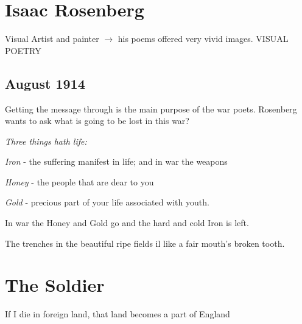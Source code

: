\documentclass{article}
\title{\jobname}
\author{Eugenio Animali}
\begin{document}
\maketitle

\section{Isaac Rosenberg}
Visual Artist and painter $\to$ his poems offered very vivid images. VISUAL POETRY

\subsection{August 1914}
Getting the message through is the main purpose of the war poets. Rosenberg wants to ask what is going to be lost in this war?

\textit{Three things hath life:}

\textit{Iron} - the suffering manifest in life; and in war the weapons

\textit{Honey} - the people that are dear to you

\textit{Gold} - precious part of your life associated with youth.

In war the Honey and Gold go and the hard and cold Iron is left.

The trenches in the beautiful ripe fields il like a fair mouth's broken tooth.

\section{The Soldier}
If I die in foreign land, that land becomes a part of England
\end{document}
